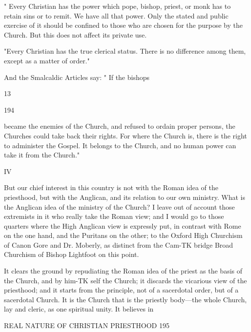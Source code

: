 \documentclass[12pt,a5paper,oneside]{book}
\begin{document}
{" Every Christian has the power which pope, 
bishop, priest, or monk has to retain sins or to remit. 
We have all that power. Only the stated and public 
exercise of it should be confined to those who are 
chosen for the purpose by the Church. But this does 
not affect its private use. 

"Every Christian has the true clerical status. 
There is no difference among them, except as a matter 
of order." 

And the Smalcaldic Articles say: " If the bishops 

13 



194 

became the enemies of the Church, and refused to 
ordain proper persons, the Churches could take back 
their rights. For where the Church is, there is the 
right to administer the Gospel. It belongs to the 
Church, and no human power can take it from the 
Church." 

IV 

But our chief interest in this country is not with the 
Roman idea of the priesthood, but with the Anglican, 
and its relation to our own ministry. What is the 
Anglican idea of the ministry of the Church? I leave 
out of account those extremists in it who really take 
the Roman view; and I would go to those quarters 
where the High Anglican view is expressly put, in 
contrast with Rome on the one hand, and the Puritans 
on the other; to the Oxford High Churchism of Canon 
Gore and Dr. Moberly, as distinct from the Cam-TK
bridge Broad Churchism of Bishop Lightfoot on this 
point. 

It clears the ground by repudiating the Roman idea 
of the priest as the basis of the Church, and by him-TK
self the Church; it discards the vicarious view of the 
priesthood; and it starts from the principle, not of a 
sacerdotal order, but of a sacerdotal Church. It is the 
Church that is the priestly body---the whole Church, 
lay and cleric, as one spiritual unity. It believes in 



REAL NATURE OF CHRISTIAN PRIESTHOOD 195 

}
\end{document}

